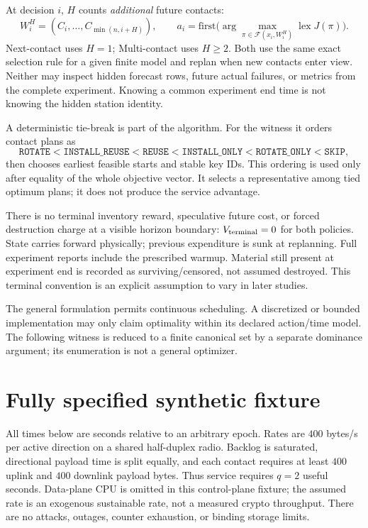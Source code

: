 \documentclass[11pt,a4paper]{article}
\newcommand{\act}[1]{\texttt{#1}}
\begin{document}
At decision $i$, $H$ counts \emph{additional} future contacts:
\[
 W_i^H=(C_i,\ldots,C_{\min(n,i+H)}),\qquad
 a_i=\mathrm{first}\bigl(\arg\max_{\pi\in\mathcal F(x_i,W_i^H)}\operatorname{lex}J(\pi)\bigr).
\]
Next-contact uses $H=1$; Multi-contact uses $H\geq2$. Both use the same exact selection rule for a given finite model and replan when new contacts enter view. Neither may inspect hidden forecast rows, future actual failures, or metrics from the complete experiment. Knowing a common experiment end time is not knowing the hidden station identity.

A deterministic tie-break is part of the algorithm. For the witness it orders contact plans as
\[
 \act{ROTATE}<\act{INSTALL\_REUSE}<\act{REUSE}<
 \act{INSTALL\_ONLY}<\act{ROTATE\_ONLY}<\act{SKIP},
\]
then chooses earliest feasible starts and stable key IDs. This ordering is used only after equality of the whole objective vector. It selects a representative among tied optimum plans; it does not produce the service advantage.

There is no terminal inventory reward, speculative future cost, or forced destruction charge at a visible horizon boundary: $V_{\rm terminal}=0$ for both policies. State carries forward physically; previous expenditure is sunk at replanning. Full experiment reports include the prescribed warmup. Material still present at experiment end is recorded as surviving/censored, not assumed destroyed. This terminal convention is an explicit assumption to vary in later studies.

The general formulation permits continuous scheduling. A discretized or bounded implementation may only claim optimality within its declared action/time model. The following witness is reduced to a finite canonical set by a separate dominance argument; its enumeration is not a general optimizer.

\section{Fully specified synthetic fixture}
All times below are seconds relative to an arbitrary epoch. Rates are $400$ bytes/s per active direction on a shared half-duplex radio. Backlog is saturated, directional payload time is split equally, and each contact requires at least $400$ uplink and $400$ downlink payload bytes. Thus service requires $q=2$ useful seconds. Data-plane CPU is omitted in this control-plane fixture; the assumed rate is an exogenous sustainable rate, not a measured crypto throughput. There are no attacks, outages, counter exhaustion, or binding storage limits.
\end{document}
